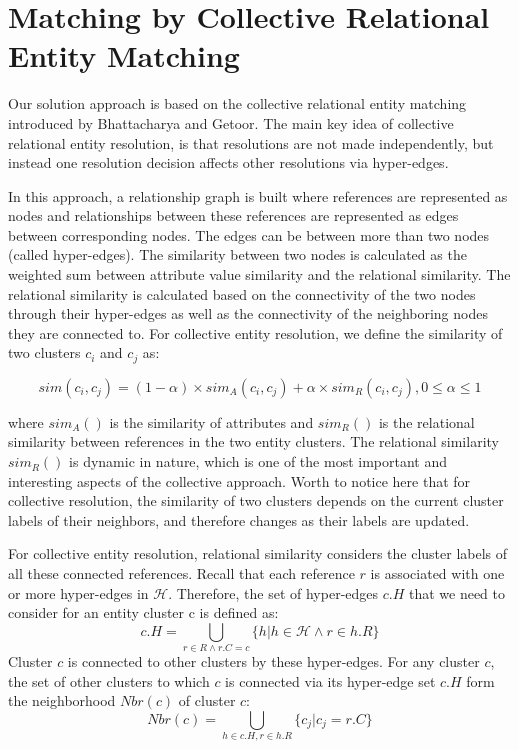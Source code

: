 \section{Matching by Collective Relational Entity Matching}
Our solution approach is based on the collective relational entity matching introduced by Bhattacharya and Getoor\cite{BhGe07}. The main key idea of collective relational entity resolution,  is that resolutions are not made independently, but instead one resolution decision affects other resolutions via hyper-edges\cite{BhGe06b}.
 
In this approach, a relationship graph is built where references are represented as nodes and relationships between these references are represented as edges between corresponding nodes. The edges can be between more than two nodes (called hyper-edges). The similarity between two nodes is calculated as the weighted sum between attribute value similarity and the relational similarity. The relational similarity is calculated based on the connectivity of the two nodes through their hyper-edges as well as the connectivity of the neighboring nodes they are connected to. For collective entity resolution, we define the similarity of two clusters $c_i$ and $c_j$ as\cite{BhGe06b}:

$$sim(c_i,c_j)=(1-\alpha) \times sim_A(c_i,c_j) + \alpha \times sim_R(c_i,c_j), 0\leq\alpha\leq1$$

where $sim_A()$ is the similarity of attributes and $sim_R()$ is the relational similarity between references in the two entity clusters. The relational similarity $sim_R()$ is dynamic in nature, which is one of the most important and interesting aspects of the collective approach\cite{BhGe07}. Worth to notice here that for collective resolution, the similarity of two clusters depends on the current cluster labels of their neighbors, and therefore changes as their labels are updated.

For collective entity resolution, relational similarity considers the cluster labels of all these connected references. Recall that each reference $r$ is associated with one or more hyper-edges in $\mathcal{H}$. Therefore, the set of hyper-edges $c.H$ that we need to consider for an entity cluster c is defined as\cite{BhGe07}:
$$c.H= \bigcup_{r\in R \wedge r.C=c}\{h|h\in \mathcal{H} \wedge r \in h.R\}$$
Cluster $c$ is connected to other clusters by these hyper-edges. For any cluster $c$, the set of other clusters to which $c$ is connected via its hyper-edge set $c.H$ form the neighborhood $Nbr(c)$ of cluster $c$\cite{BhGe07}:
$$Nbr(c)= \bigcup_{h\in c.H,r\in h.R}\{c_j|c_j=r.C\}$$

